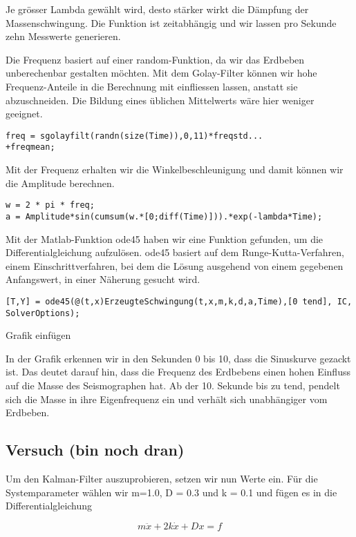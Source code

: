 Je grösser Lambda gewählt wird, desto stärker wirkt die Dämpfung der Massenschwingung.
Die Funktion ist zeitabhängig und wir lassen pro Sekunde zehn Messwerte generieren.

Die Frequenz basiert auf einer random-Funktion, da wir das Erdbeben unberechenbar gestalten möchten.
Mit dem Golay-Filter können wir hohe Frequenz-Anteile in die Berechnung mit einfliessen lassen, anstatt sie abzuschneiden.
Die Bildung eines üblichen Mittelwerts wäre hier weniger geeignet.

\begin{lstlisting}
freq = sgolayfilt(randn(size(Time)),0,11)*freqstd...
+freqmean;
\end{lstlisting}

Mit der Frequenz erhalten wir die Winkelbeschleunigung und damit können wir die Amplitude berechnen. 


\begin{lstlisting}
w = 2 * pi * freq;
a = Amplitude*sin(cumsum(w.*[0;diff(Time)])).*exp(-lambda*Time);
\end{lstlisting}

Mit der Matlab-Funktion ode45 haben wir eine Funktion gefunden, um die Differentialgleichung aufzulösen. ode45 basiert auf dem Runge-Kutta-Verfahren, einem Einschrittverfahren, bei dem die Lösung ausgehend von einem gegebenen Anfangswert, in einer Näherung gesucht wird.

\begin{lstlisting}
[T,Y] = ode45(@(t,x)ErzeugteSchwingung(t,x,m,k,d,a,Time),[0 tend], IC, SolverOptions);
\end{lstlisting}

Grafik einfügen

In der Grafik erkennen wir in den Sekunden 0 bis 10, dass die Sinuskurve gezackt ist.
Das deutet darauf hin, dass die Frequenz des Erdbebens einen hohen Einfluss auf die Masse des Seismographen hat.
Ab der 10. Sekunde bis zu tend, pendelt sich die Masse in ihre Eigenfrequenz ein und verhält sich unabhängiger vom Erdbeben.

\subsection{Versuch (bin noch dran)}

Um den Kalman-Filter auszuprobieren, setzen wir nun Werte ein.
Für die Systemparameter wählen wir m=1.0, D = 0.3 und k = 0.1 und fügen es in die Differentialgleichung

\begin{equation}
	m\ddot x + 2k \dot x + Dx = f	
\end{equation} 

